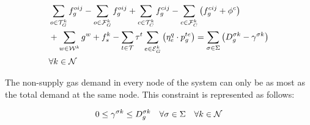 
\begin{equation}
\begin{aligned}
& \sum_{o \in {\cal{T}}^{k}_{G}}{{f}_{g}^{oij}} - \sum_{o \in {\cal{F}}^{k}_{G}}{{f}_{g}^{oij}} + \sum_{c \in {\cal{T}}^{k}_{C}}{{f}_{g}^{cij}} - \sum_{c \in {\cal{F}}^{k}_{C}}{ \left({f}_{g}^{cij} + \phi^{c}\right)} \\
& + \sum_{w \in {\cal{W}}^{k}}{g^{w}}  + {f}^{k}_{s} - \sum_{t \in \cal{T}} {\tau}^{t} \sum_{e \in {\cal{E}}^{k}_{G}}\left({\eta^{q}_{e}}\cdot {p_{g}^{te}}\right) = {\sum_{\sigma \in \Sigma}\left( D^{\sigma k}_{g} - \gamma^{\sigma k}\right)} \\
& \forall k \in \cal{N}
\end{aligned}
\label{node_gas_balance}
\end{equation}

The non-supply gas demand in every node of the system can only be as most as the total demand at the same node. This constraint is represented as follows:

\begin{equation}
{0 \le \gamma^{\sigma k} \le D^{\sigma k}_{g} \quad \forall \sigma \in \Sigma \quad \forall k \in \cal{N}}
\label{nsg_limits}
\end{equation}


